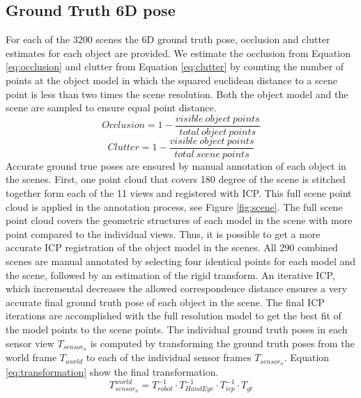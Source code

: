 \documentclass[10pt,twocolumn,letterpaper]{article}
\begin{document}
\subsection{Ground Truth 6D pose}
For each of the 3200 scenes the 6D ground truth pose, occlusion and clutter estimates for each object are provided. We estimate the occlusion from Equation \ref{eq:occlusion} and clutter from Equation \ref{eq:clutter} by counting the number of points at the object model in which the squared euclidean distance to a scene point is less than two times the scene resolution. Both the object model and the scene are sampled to ensure equal point distance.
\begin{equation}
Occlusion = 1 - \frac{visible \: object \: points }{total \: object \: points} 
\label{eq:occlusion}
\end{equation}
\begin{equation}
Clutter = 1 - \frac{visible \: object \: points}{total \: scene \: points}
\label{eq:clutter}
\end{equation}
\indent
Accurate ground true poses are ensured by manual annotation of each object in the scenes. First, one point cloud that covers 180 degree of the scene is stitched together form each of the 11 views and registered with ICP. This full scene point cloud is applied in the annotation process, see Figure \ref{fig:scene}. The full scene point cloud covers the geometric structures of each model in the scene with more point compared to the individual views. Thus, it is possible to get a more accurate ICP registration of the object model in the scenes. All 290 combined scenes are manual annotated by selecting four identical points for each model and the scene, followed by an estimation of the rigid transform. An iterative ICP, which incremental decreases the allowed correspondence distance ensures a very accurate final ground truth pose of each object in the scene. The final ICP iterations are accomplished with the full resolution model to get the best fit of the model points to the scene points. The individual ground truth poses in each sensor view $T_{sensor_{n}}$ is computed by transforming the ground truth poses from the world frame $T_{world}$ to each of the individual sensor frames $T_{sensor_{n}}$. Equation \ref{eq:transformation} show the final transformation. 
\begin{equation}
T^{world}_{sensor_{n}} = T^{-1}_{robot} \cdot T^{-1}_{HandEye} \cdot T^{-1}_{icp} \cdot T_{gt}
\label{eq:transformation}
\end{equation}
\end{document}

